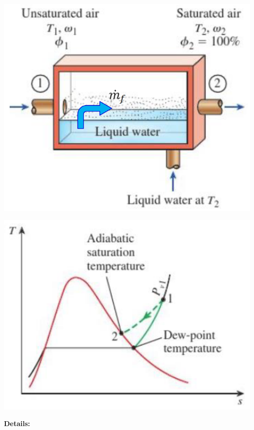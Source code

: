 \documentclass[11pt]{article}
\begin{document}
\begin{center}
\includegraphics[scale=0.7]{./images/adiabatic-saturation-process-diagram.png}
\end{center}

\begin{center}
\includegraphics[scale=0.7]{./images/adiabatic-saturation-temperature-t-s-diagram.png}
\end{center}

\textbf{Details:}
\end{document}
